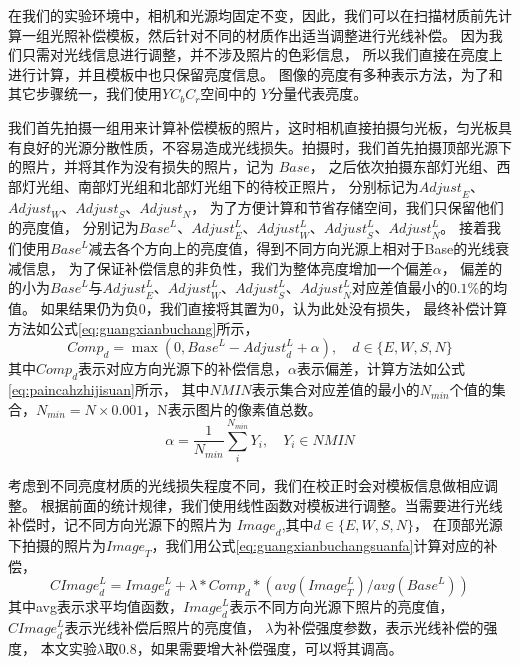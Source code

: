 在我们的实验环境中，相机和光源均固定不变，因此，我们可以在扫描材质前先计算一组光照补偿模板，然后针对不同的材质作出适当调整进行光线补偿。
因为我们只需对光线信息进行调整，并不涉及照片的色彩信息，
所以我们直接在亮度上进行计算，并且模板中也只保留亮度信息。
图像的亮度有多种表示方法，为了和其它步骤统一，我们使用$YC_b C_r$空间中的
$Y$分量代表亮度。

我们首先拍摄一组用来计算补偿模板的照片，这时相机直接拍摄匀光板，匀光板具有良好的光源分散性质，不容易造成光线损失。拍摄时，我们首先拍摄顶部光源下的照片，并将其作为没有损失的照片，记为
$Base$，
之后依次拍摄东部灯光组、西部灯光组、南部灯光组和北部灯光组下的待校正照片，
分别标记为${Adjust}_E$、${Adjust}_W$、${Adjust}_S$、${Adjust}_N$，
为了方便计算和节省存储空间，我们只保留他们的亮度值，
分别记为${Base}^L$、${Adjust}_E^L$、${Adjust}_W^L$、${Adjust}_S^L$、${Adjust}_N^L$。
接着我们使用${Base}^L$减去各个方向上的亮度值，得到不同方向光源上相对于Base的光线衰减信息，
为了保证补偿信息的非负性，我们为整体亮度增加一个偏差$\alpha$，
偏差的的小为${Base}^L$与${Adjust}_E^L$、${Adjust}_W^L$、${Adjust}_S^L$、${Adjust}_N^L$对应差值最小的$0.1\%$的均值。
如果结果仍为负0，我们直接将其置为0，认为此处没有损失，
最终补偿计算方法如公式\eqref{eq:guangxianbuchang}所示，
\begin{equation}\label{eq:guangxianbuchang}
{Comp}_d=\max ({0,{Base}^L-{Adjust}_d^L+\alpha }),\quad d\in \{E,W,S,N \}
\end{equation}
其中${Comp}_d$表示对应方向光源下的补偿信息，$\alpha$表示偏差，计算方法如公式\eqref{eq:paincahzhijisuan}所示，
其中$NMIN$表示集合对应差值的最小的$N_{min}$个值的集合，$N_{min}=N\times 0.001$，N表示图片的像素值总数。
\begin{equation}\label{eq:paincahzhijisuan}
\alpha =\frac {1}{N_{min}} \sum_{i}^{N_{min}}{Y_i},\quad Y_i\in NMIN
\end{equation}

考虑到不同亮度材质的光线损失程度不同，我们在校正时会对模板信息做相应调整。
根据前面的统计规律，我们使用线性函数对模板进行调整。当需要进行光线补偿时，记不同方向光源下的照片为
${Image}_d$,其中$d \in \{E,W,S,N\}$，
在顶部光源下拍摄的照片为${Image}_T$，我们用公式\eqref{eq:guangxianbuchangsuanfa}计算对应的补偿，
\begin{equation}
\label{eq:guangxianbuchangsuanfa}
{CImage}_d^L={Image}_d^L+\lambda*{Comp}_d*(avg({Image}_T^L)/avg({Base}^L))
\end{equation}
其中avg表示求平均值函数，${Image}_d^L$表示不同方向光源下照片的亮度值，
${CImage}_d^L$表示光线补偿后照片的亮度值，
$\lambda$为补偿强度参数，表示光线补偿的强度，
本文实验$\lambda$取$0.8$，如果需要增大补偿强度，可以将其调高。

